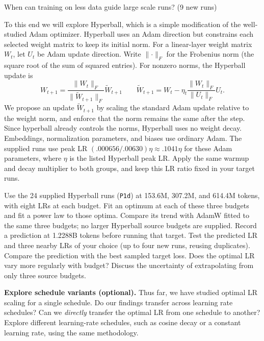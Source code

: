 \begin{problem}{When can training on less data guide large scale runs? (9 new runs)}
\begin{parts}
To this end we will explore Hyperball, which is a simple modification of the well-studied Adam optimizer. Hyperball uses an Adam direction but constrains each selected weight matrix to
keep its initial norm. For a linear-layer weight matrix $W_t$, let $U_{t}$ be Adam update direction. Write
$\lVert\cdot\rVert_F$ for the Frobenius norm (the square root of the sum of
squared entries). For nonzero norms, the Hyperball update is
\[
  W_{t+1}
=\frac{\lVert W_t\rVert_F}{\lVert\widetilde W_{t+1}\rVert_F}
\widetilde W_{t+1}
\qquad
\widetilde W_{t+1}
= W_t-\eta_t\frac{\lVert W_t\rVert_F}{\lVert U_t\rVert_F}U_t.
\]
We propose an update $\widetilde W_{{t+1}}$ by scaling the standard Adam update relative to the weight norm, and enforce that the norm remains the same after the step. Since hyperball already controls the norms, Hyperball uses no weight decay. Embeddings, normalization parameters, and biases use ordinary Adam.
The supplied runs use peak LR $(.000656/.00630)\eta\approx .1041\eta$ for
these Adam parameters, where $\eta$ is the listed Hyperball peak LR.
Apply the same warmup and decay multiplier to both groups, and keep this LR
ratio fixed in your target runs.

Use the 24 supplied Hyperball runs (\texttt{P1d}) at 153.6M, 307.2M,
and 614.4M tokens, with eight LRs at each budget. Fit an optimum at each
of these three budgets and fit a power law to those optima. Compare its trend
with AdamW fitted to the same three budgets; no larger Hyperball source budgets
are supplied. Record a prediction at 1.2288B tokens before running that target.
Test the predicted LR and three nearby LRs of your choice (up to four new runs,
reusing duplicates). Compare the prediction with the best sampled target loss.
Does the optimal LR vary more regularly with budget? Discuss the uncertainty
of extrapolating from only three source budgets.

\item \textbf{Explore schedule variants (optional).}
Thus far, we have studied optimal LR scaling for a single schedule. Do our findings transfer across learning rate schedules? Can we \emph{directly} transfer the optimal LR from one schedule to another?
Explore different learning-rate schedules, such as cosine decay or a constant
learning rate, using the same methodology.
\end{parts}
\end{problem}
\clearpage
